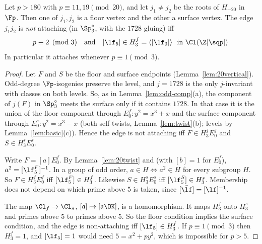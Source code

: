 \begin{theorem}\label{thm:A20}
Let $p>180$ with $p\equiv11,19\pmod{20}$, and let $j_1\neq j_2$ be the roots of $H_{-20}$ in $\Fp$.
Then one of $j_1,j_2$ is a floor vertex and the other a surface vertex.  The edge $j_1j_2$ is
\emph{not} attaching (in $\Sp^\circ_3$, with the $1728$ gluing) iff
\[p\equiv2\pmod3\quad\text{and}\quad[\lf_5]\in H_3^f=\langle[\lf_3]\rangle\ \text{ in }\Cl(\Z[\sqp]).\]
In particular it attaches whenever $p\equiv1\pmod3$.
\end{theorem}
\begin{proof}
Let $F$ and $S$ be the floor and surface endpoints (Lemma~\ref{lem:20vertical}).  Odd-degree
$\Fp$-isogenies preserve the level, and $j=1728$ is the only $j$-invariant with classes on both
levels.  So, as in Lemma~\ref{lem:odd-comp}(a), the component of $j(F)$ in $\Sp^\circ_3$ meets the
surface only if it contains $1728$.  In that case it is the union of the floor component through
$E_0^f:y^2=x^3+x$ and the surface component through $E_0^s:y^2=x^3-x$ (both self-twists,
Lemma~\ref{lem:twist}(b); levels by Lemma~\ref{lem:basic}(c)).  Hence the edge is not attaching iff
$F\in H_3^fE_0^f$ and $S\in H_3^sE_0^s$.

Write $F=[a]E_0^f$.  By Lemma~\ref{lem:20twist} and \cite[Lemma~16]{CPV} (with $[b]=1$ for
$E_0^f$), $a^2=[\lf_5^F]^{-1}$.  In a group of odd order, $a\in H\iff a^2\in H$ for every subgroup
$H$.  So $F\in H_3^fE_0^f$ iff $[\lf_5^F]\in H_3^f$.  Likewise $S\in H_3^sE_0^s$ iff
$[\lf_5^S]\in H_3^s$.  Membership does not depend on which prime above $5$ is taken, since
$[\bar\lf]=[\lf]^{-1}$.

The map $\Cl_f\to\Cl_s$, $[\mathfrak a]\mapsto[\mathfrak a\OK]$, is a homomorphism.  It maps $H_3^f$
onto $H_3^s$ and primes above $5$ to primes above $5$.  So the floor condition implies the surface
condition, and the edge is non-attaching iff $[\lf_5]\in H_3^f$.  If $p\equiv1\pmod3$ then
$H_3^f=1$, and $[\lf_5]=1$ would need $5=x^2+py^2$, which is impossible for $p>5$.
\end{proof}


